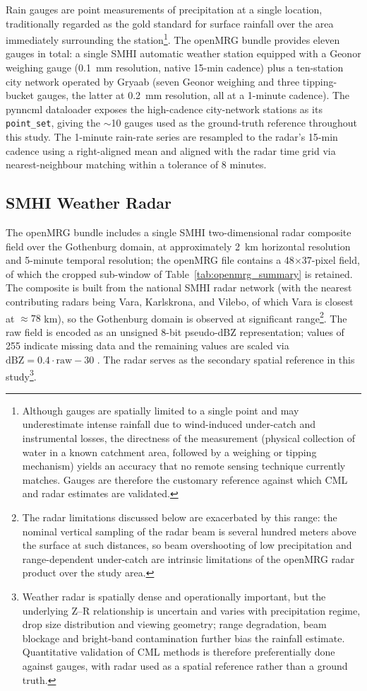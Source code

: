 \documentclass[12pt, a4paper]{article}
\begin{document}
Rain gauges are point measurements of precipitation at a single
location, traditionally regarded as the gold standard for surface
rainfall over the area immediately surrounding the
station\footnote{Although gauges are spatially limited to a single
point and may underestimate intense rainfall due to wind-induced
under-catch and instrumental losses, the directness of the measurement
(physical collection of water in a known catchment area, followed by a
weighing or tipping mechanism) yields an accuracy that no remote
sensing technique currently matches. Gauges are therefore the customary
reference against which CML and radar estimates are validated.}.
The openMRG bundle provides eleven gauges in total: a single SMHI
automatic weather station equipped with a Geonor weighing gauge
(0.1~mm resolution, native 15-min cadence) plus a ten-station city
network operated by Gryaab (seven Geonor weighing and three
tipping-bucket gauges, the latter at 0.2~mm resolution, all at a
1-minute cadence). The pynncml dataloader exposes the high-cadence
city-network stations as its \texttt{point\_set}, giving the
\(\sim\)10 gauges used as the ground-truth reference throughout this
study. The 1-minute rain-rate series are resampled to the radar's
15-min cadence using a right-aligned mean and aligned with the radar
time grid via nearest-neighbour matching within a tolerance of
8 minutes.

\subsection{SMHI Weather Radar}

The openMRG bundle includes a single SMHI two-dimensional radar
composite field over the Gothenburg domain, at approximately 2~km
horizontal resolution and 5-minute temporal resolution; the openMRG
file contains a 48\(\times\)37-pixel field, of which the cropped
sub-window of Table~\ref{tab:openmrg_summary} is retained. The
composite is built from the national SMHI radar network (with the
nearest contributing radars being Vara, Karlskrona, and Vilebo, of
which Vara is closest at \(\approx 78\) km), so the Gothenburg domain
is observed at significant range\footnote{The radar limitations
discussed below are exacerbated by this range: the nominal vertical
sampling of the radar beam is several hundred meters above the surface
at such distances, so beam overshooting of low precipitation and
range-dependent under-catch are intrinsic limitations of the openMRG
radar product over the study area.}. The raw field is encoded as an
unsigned 8-bit pseudo-dBZ representation; values of 255 indicate
missing data and the remaining values are scaled via
\(\mathrm{dBZ} = 0.4\!\cdot\!\text{raw} - 30\)
\cite{andersson2023openmrg}. The radar serves as the secondary spatial
reference in this study\footnote{Weather radar is
spatially dense and operationally important, but the underlying Z--R
relationship is uncertain and varies with precipitation regime, drop
size distribution and viewing geometry; range degradation, beam
blockage and bright-band contamination further bias the rainfall
estimate. Quantitative validation of CML methods is therefore
preferentially done against gauges, with radar used as a spatial
reference rather than a ground truth.}.
\end{document}
